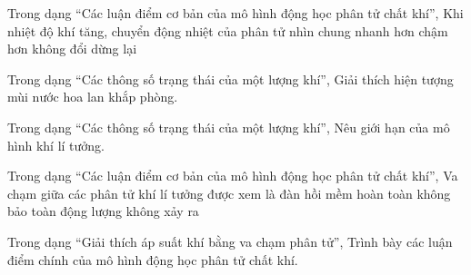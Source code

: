 \begin{ex}
Trong dạng “Các luận điểm cơ bản của mô hình động học phân tử chất khí”, Khi nhiệt độ khí tăng, chuyển động nhiệt của phân tử nhìn chung
\choice
{\True nhanh hơn}
{chậm hơn}
{không đổi}
{dừng lại}
\end{ex}

\begin{ex}
Trong dạng “Các thông số trạng thái của một lượng khí”, Giải thích hiện tượng mùi nước hoa lan khắp phòng.
\choiceTF

\end{ex}

\begin{ex}
Trong dạng “Các thông số trạng thái của một lượng khí”, Nêu giới hạn của mô hình khí lí tưởng.
\choiceTF

\end{ex}

\begin{ex}
Trong dạng “Các luận điểm cơ bản của mô hình động học phân tử chất khí”, Va chạm giữa các phân tử khí lí tưởng được xem là
\choice
{\True đàn hồi}
{mềm hoàn toàn}
{không bảo toàn động lượng}
{không xảy ra}
\end{ex}

\begin{ex}
Trong dạng “Giải thích áp suất khí bằng va chạm phân tử”, Trình bày các luận điểm chính của mô hình động học phân tử chất khí.
\choiceTF

\end{ex}


